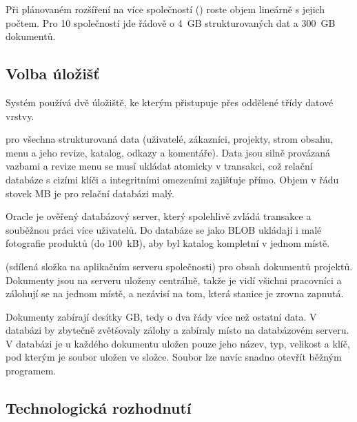 Při plánovaném rozšíření na více společností () roste objem lineárně s jejich počtem. Pro 10 společností jde řádově o 4~GB strukturovaných dat a 300~GB dokumentů.

\subsection{Volba úložišť}\label{sec:uloziste}

Systém používá dvě úložiště, ke kterým přistupuje přes oddělené třídy datové vrstvy.

\begin{description}[itemsep=2pt,style=unboxed]
  \item[Relační databáze Oracle] pro všechna strukturovaná data (uživatelé, zákazníci, projekty, strom obsahu, menu a jeho revize, katalog, odkazy a komentáře). Data jsou silně provázaná vazbami a revize menu se musí ukládat atomicky v transakci, což relační databáze s cizími klíči a integritními omezeními zajišťuje přímo. Objem v řádu stovek MB je pro relační databázi malý.

Oracle je ověřený databázový server, který spolehlivě zvládá transakce a souběžnou práci více uživatelů. Do databáze se jako BLOB ukládají i malé fotografie produktů (do 100~kB), aby byl katalog kompletní v jednom místě.
  \item[Souborové úložiště dokumentů] (sdílená složka na aplikačním serveru společnosti) pro obsah dokumentů projektů. Dokumenty jsou na serveru uloženy centrálně, takže je vidí všichni pracovníci a zálohují se na jednom místě, a nezávisí na tom, která stanice je zrovna zapnutá.

Dokumenty zabírají desítky GB, tedy o dva řády více než ostatní data. V databázi by zbytečně zvětšovaly zálohy a zabíraly místo na databázovém serveru. V databázi je u každého dokumentu uložen pouze jeho název, typ, velikost a klíč, pod kterým je soubor uložen ve složce. Soubor lze navíc snadno otevřít běžným programem.
\end{description}

\subsection{Technologická rozhodnutí}

